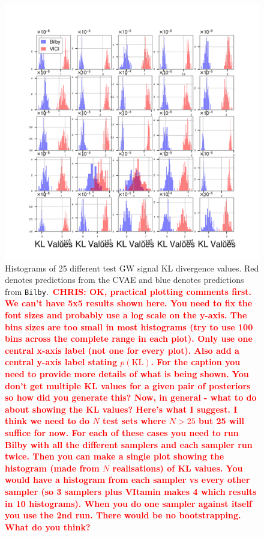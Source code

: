 \documentclass[%
showpacs,
 amsmath,amssymb,
 aps,
 twocolumn,
 prl,
 reprint,
floatfix,
]{revtex4-1}
\newcommand{\chris}[1]{\textbf{\textcolor{red}{CHRIS: #1}}}
\begin{document}
%
%
\begin{figure}
    \includegraphics[width=\columnwidth]{images/hist-kl_0.png}
    \caption{\label{fig:kl_results} Histograms of 25 different test GW signal
\ac{KL} divergence values.  Red denotes predictions from the CVAE and blue denotes
predictions from \texttt{Bilby}.~\chris{OK, practical plotting comments first.
We can't have 5x5 results shown here. You need to fix the font sizes and
probably use a log scale on the y-axis. The bins sizes are too small in most
histograms (try to use 100 bins across the complete range in each plot). Only
use one central x-axis label (not one for every plot). Also add a central
y-axis label stating $p(\text{KL})$. For the caption you need to provide more
details of what is being shown. You don't get multiple KL values for a given
pair of posteriors so how did you generate this? Now, in general - what to do
about showing the KL values? Here's what I suggest. I think we need to do $N$
test sets where $N>25$ but 25 will suffice for now. For each of these cases you
need to run Bilby with all the different samplers and each sampler run twice.
Then you can make a single plot showing the histogram (made from $N$
realisations) of KL values. You would have a histogram from each sampler vs
every other sampler (so 3 samplers plus VItamin makes 4 which results in 10
histograms). When  you do one sampler against itself you use the 2nd run. There
would be no bootstrapping. What do you think?}}
\end{figure}
\end{document}
